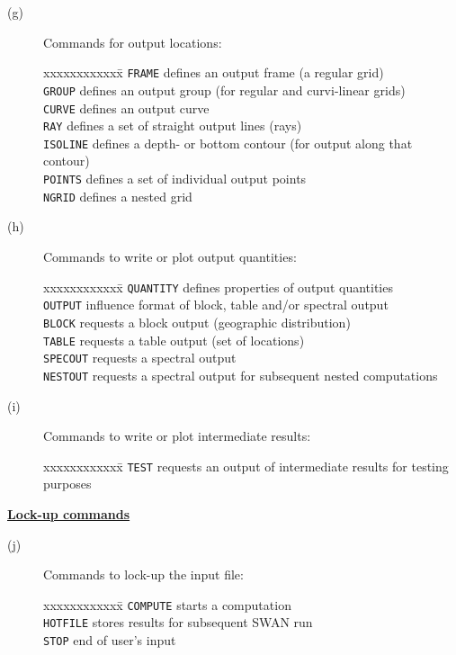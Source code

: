 \documentclass[12pt]{book}
\begin{document}
\begin{description}
  \item[(g)] Commands for output locations:
\begin{tabbing}
xxxxxxxxxxxx\= \kill
{\tt FRAME}   \> defines an output frame (a regular grid)\\
{\tt GROUP}   \> defines an output group (for regular and curvi-linear grids)\\
{\tt CURVE}   \> defines an output curve\\
{\tt RAY}     \> defines a set of straight output lines (rays)\\
{\tt ISOLINE} \> defines a depth- or bottom contour (for output along that contour)\\
{\tt POINTS}  \> defines a set of individual output points\\
{\tt NGRID}   \> defines a nested grid\\
\end{tabbing}
  \item[(h)] Commands to write or plot output quantities:
\begin{tabbing}
xxxxxxxxxxxx\= \kill
{\tt QUANTITY} \> defines properties of output quantities\\
{\tt OUTPUT}   \> influence format of block, table and/or spectral output\\
{\tt BLOCK}    \> requests a block output (geographic distribution)\\
{\tt TABLE}    \> requests a table output (set of locations)\\
{\tt SPECOUT}  \> requests a spectral output\\
{\tt NESTOUT}  \> requests a spectral output for subsequent nested computations\\
\end{tabbing}
  \item[(i)] Commands to write or plot intermediate results:
\begin{tabbing}
xxxxxxxxxxxx\= \kill
{\tt TEST} \> requests an output of intermediate results for testing purposes\\
\end{tabbing}
\end{description}
\underline{\bf Lock-up commands}
\begin{description}
  \item[(j)] Commands to lock-up the input file:
\begin{tabbing}
xxxxxxxxxxxx\= \kill
{\tt COMPUTE} \> starts a computation\\
{\tt HOTFILE} \> stores results for subsequent SWAN run\\
{\tt STOP}    \> end of user's input\\
\end{tabbing}
\end{description}
\end{document}
